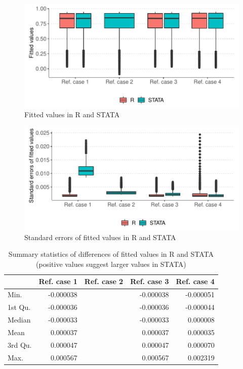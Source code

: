 \documentclass[
]{article}
\begin{document}
\begin{figure}
\centering
\includegraphics{aldvmm_vignette_files/figure-latex/box-pred-yhat-stata-1.pdf}
\caption{\label{fig:box-pred-yhat-stata}Fitted values in R and STATA}
\end{figure}

\begin{figure}
\centering
\includegraphics{aldvmm_vignette_files/figure-latex/box-pred-se-stata-1.pdf}
\caption{\label{fig:box-pred-se-stata}Standard errors of fitted values in R and STATA}
\end{figure}

\begin{table}[ht]
\centering
\caption{Summary statistics of differences of fitted values in R and STATA (positive values suggest larger values in STATA)} 
\label{tab:compyhat}
\begin{tabular}{lrrrr}
  \hline
 & Ref. case 1 & Ref. case 2 & Ref. case 3 & Ref. case 4 \\ 
  \hline
Min. & -0.000038 &  & -0.000038 & -0.000051 \\ 
  1st Qu. & -0.000036 &  & -0.000036 & -0.000044 \\ 
  Median & -0.000033 &  & -0.000033 & 0.000008 \\ 
  Mean & 0.000037 &  & 0.000037 & 0.000035 \\ 
  3rd Qu. & 0.000047 &  & 0.000047 & 0.000070 \\ 
  Max. & 0.000567 &  & 0.000567 & 0.002319 \\ 
   \hline
\end{tabular}
\end{table}
\end{document}
